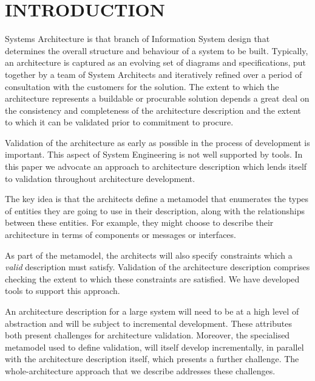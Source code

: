 \documentclass[a4paper,twoside]{article}
\begin{document}
\onecolumn \maketitle \normalsize \vfill

\section{\uppercase{Introduction}}
\label{sec:introduction}

\noindent Systems Architecture is that branch of Information System design that determines the overall structure and behaviour of a system to be built. Typically, an architecture is captured as an evolving set of diagrams and specifications, put together by a team of System Architects and iteratively refined over a period of consultation with the customers for the solution. The extent to which the architecture represents a buildable or procurable solution depends a great deal on the consistency and completeness of the architecture description and the extent to which it can be validated prior to commitment to procure.

Validation of the architecture as early as possible in the process of development is important. This aspect of System Engineering is not well supported by tools. In this paper we advocate an approach to architecture description which lends itself to validation throughout architecture development.

The key idea is that the architects define a metamodel that enumerates the types of entities they are going to use in their description, along with the relationships between these entities. For example, they might choose to describe their architecture in terms of components or messages or interfaces. 

As part of the metamodel, the architects will also specify constraints which a {\em valid} description must satisfy. Validation of the architecture description comprises checking the extent to which these constraints are satisfied. We have developed tools to support this approach.

An architecture description for a large system will need to be at a high level of abstraction and will be subject to incremental development. These attributes both present challenges for architecture validation. Moreover, the specialised metamodel used to define validation, will itself develop incrementally, in parallel with the architecture description itself, which presents a further challenge. The whole-architecture approach that we describe addresses these challenges.
\end{document}
